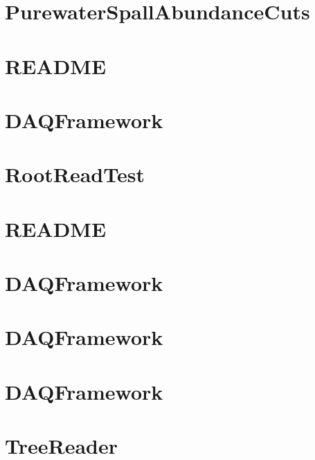 \let\mypdfximage\pdfximage\def\pdfximage{\immediate\mypdfximage}\documentclass[twoside]{book}
\newcommand{\+}{\discretionary{\mbox{\scriptsize$\hookleftarrow$}}{}{}}
\begin{document}
\chapter{Purewater\+Spall\+Abundance\+Cuts}
\label{md_UserTools_PurewaterSpallAbundanceCuts_README}

\chapter{README}
\label{md_UserTools_ReadMCInfo_README}

\chapter{DAQFramework}
\label{md_UserTools_README}

\chapter{Root\+Read\+Test}
\label{md_UserTools_RootReadTest_README}

\chapter{README}
\label{md_UserTools_SimplifyTree_README}

\chapter{DAQFramework}
\label{md_UserTools_SK2p2MeV_README}

\chapter{DAQFramework}
\label{md_UserTools_template_README}

\chapter{DAQFramework}
\label{md_UserTools_TestTool_README}

\chapter{Tree\+Reader}
\label{md_UserTools_TreeReader_README}

\end{document}
